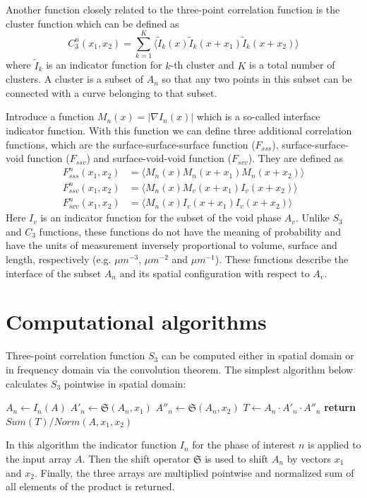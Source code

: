 \documentclass[1p]{elsarticle}
\begin{document}
Another function closely related to the three-point correlation function is the
cluster function which can be defined as
\begin{equation}
  C_3^n(x_1, x_2) = \sum_{k=1}^K \langle \tilde{I}_k(x) \tilde{I}_k(x + x_1) \tilde{I}_k(x + x_2) \rangle
\end{equation}
where $\tilde{I}_k$ is an indicator function for $k$-th cluster and $K$ is a
total number of clusters. A cluster is a subset of $A_n$ so that any two points
in this subset can be connected with a curve belonging to that subset.

Introduce a function $M_n(x) = |\nabla I_n(x)|$ which is a so-called interface
indicator function. With this function we can define three additional
correlation functions, which are the surface-surface-surface function
($F_{sss}$), surface-surface-void function ($F_{ssv}$) and surface-void-void
function ($F_{svv}$). They are defined as
\begin{align}
  F_{sss}^n(x_1, x_2) &= \langle M_n(x) M_n(x + x_1) M_n(x + x_2) \rangle \\
  F_{ssv}^n(x_1, x_2) &= \langle M_n(x) M_v(x + x_1) I_v(x + x_2) \rangle \\
  F_{svv}^n(x_1, x_2) &= \langle M_n(x) I_v(x + x_1) I_v(x + x_2) \rangle
\end{align}
Here $I_v$ is an indicator function for the subset of the void phase
$A_v$. Unlike $S_3$ and $C_3$ functions, these functions do not have the meaning
of probability and have the units of measurement inversely proportional to
volume, surface and length, respectively (e.g. $\mu m^{-3}$, $\mu m^{-2}$ and
$\mu m^{-1}$). These functions describe the interface of the subset $A_n$ and
its spatial configuration with respect to $A_v$.

\section{Computational algorithms}
Three-point correlation function $S_3$ can be computed either in spatial domain
or in frequency domain via the convolution theorem. The simplest algorithm below
calculates $S_3$ pointwise in spatial domain:
\begin{algorithmic}[1]
  \State $A_n \gets I_n (A)$
  \State $A'_n \gets \mathfrak{S}(A_n, x_1)$
  \State $A''_n \gets \mathfrak{S}(A_n, x_2)$
  \State $T \gets A_n \cdot A'_n \cdot A''_n$
  \State \textbf{return} $Sum(T) / Norm(A, x_1, x_2)$
  \EndProcedure
\end{algorithmic}
In this algorithm the indicator function $I_n$ for the phase of interest $n$ is
applied to the input array $A$. Then the shift operator $\mathfrak{S}$ is used
to shift $A_n$ by vectors $x_1$ and $x_2$. Finally, the three arrays are
multiplied pointwise and normalized sum of all elements of the product is
returned.
\end{document}
